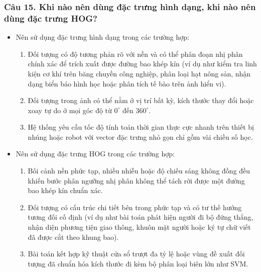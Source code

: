 \documentclass[12pt,a4paper]{article}
\begin{document}
\subsubsection*{Câu 15. Khi nào nên dùng đặc trưng hình dạng, khi nào nên dùng đặc trưng HOG?}
\begin{itemize}
    \item Nên sử dụng đặc trưng hình dạng trong các trường hợp:
    \begin{enumerate}
        \item Đối tượng có độ tương phản rõ với nền và có thể phân đoạn nhị phân chính xác để trích xuất được đường bao khép kín (ví dụ như kiểm tra linh kiện cơ khí trên băng chuyền công nghiệp, phân loại hạt nông sản, nhận dạng biển báo hình học hoặc phân tích tế bào trên ảnh hiển vi).
        \item Đối tượng trong ảnh có thể nằm ở vị trí bất kỳ, kích thước thay đổi hoặc xoay tự do ở mọi góc độ từ $0^\circ$ đến $360^\circ$.
        \item Hệ thống yêu cầu tốc độ tính toán thời gian thực cực nhanh trên thiết bị nhúng hoặc robot với vector đặc trưng nhỏ gọn chỉ gồm vài chiều số học.
    \end{enumerate}
    \item Nên sử dụng đặc trưng HOG trong các trường hợp:
    \begin{enumerate}
        \item Bối cảnh nền phức tạp, nhiều nhiễu hoặc độ chiếu sáng không đồng đều khiến bước phân ngưỡng nhị phân không thể tách rời được một đường bao khép kín chuẩn xác.
        \item Đối tượng có cấu trúc chi tiết bên trong phức tạp và có tư thế hướng tương đối cố định (ví dụ như bài toán phát hiện người đi bộ đứng thẳng, nhận diện phương tiện giao thông, khuôn mặt người hoặc ký tự chữ viết đã được cắt theo khung bao).
        \item Bài toán kết hợp kỹ thuật cửa sổ trượt đa tỷ lệ hoặc vùng đề xuất đối tượng đã chuẩn hóa kích thước đi kèm bộ phân loại biên lớn như SVM.
    \end{enumerate}
\end{itemize}

\end{document}
